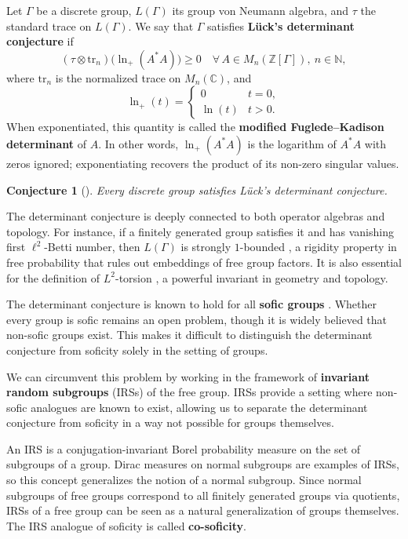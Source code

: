 \documentclass[pdflatex,sn-mathphys-num]{sn-jnl}%
\newtheorem{conjecture}[theorem]{Conjecture}
\begin{document}
Let $\Gamma$ be a discrete group, $L(\Gamma)$ its group von Neumann algebra, and $\tau$ the standard trace on $L(\Gamma)$.  
We say that $\Gamma$ satisfies \textbf{L\"uck's determinant conjecture} if
\[
(\tau \otimes \mathrm{tr}_n)\big(\ln_+(A^*A)\big) \geq 0
\quad \forall\, A \in M_n(\mathbb{Z}[\Gamma]),\ n \in \mathbb{N},
\]
where $\mathrm{tr}_n$ is the normalized trace on $M_n(\mathbb{C})$, and
\[
\ln_+(t) =
\begin{cases}
0 & t = 0, \\
\ln(t) & t > 0.
\end{cases}
\]
When exponentiated, this quantity is called the \textbf{modified Fuglede--Kadison determinant} of $A$. In other words, $\ln_+(A^*A)$ is the logarithm of $A^*A$ with zeros ignored; exponentiating recovers the product of its non-zero singular values.

\begin{conjecture}[\cite{luck_l2-invariants_2002}]
Every discrete group satisfies L\"uck's determinant conjecture.
\end{conjecture}

The determinant conjecture is deeply connected to both operator algebras and topology. 
For instance, if a finitely generated group satisfies it and has vanishing first $\ell^2$-Betti number, 
then $L(\Gamma)$ is strongly $1$-bounded \cite{hayes_vanishing_2023,shlyakhtenko_von_2021}, 
a rigidity property in free probability that rules out embeddings of free group factors. 
It is also essential for the definition of $L^2$-torsion \cite{leary_l2-invariants_2009}, 
a powerful invariant in geometry and topology. 

The determinant conjecture is known to hold for all \textbf{sofic groups} \cite{elek_hyperlinearity_2005}. Whether every group is sofic remains an open problem, though it is widely believed that non-sofic groups exist.  
This makes it difficult to distinguish the determinant conjecture from soficity solely in the setting of groups.

We can circumvent this problem by working in the framework of \textbf{invariant random subgroups} (IRSs) of the free group. IRSs provide a setting where non-sofic analogues are known to exist, allowing us to separate the determinant conjecture from soficity in a way not possible for groups themselves.

An IRS is a conjugation-invariant Borel probability measure on the set of subgroups of a group.  
Dirac measures on normal subgroups are examples of IRSs, so this concept generalizes the notion of a normal subgroup.  
Since normal subgroups of free groups correspond to all finitely generated groups via quotients, IRSs of a free group can be seen as a natural generalization of groups themselves.  
The IRS analogue of soficity is called \textbf{co-soficity}.
\end{document}
